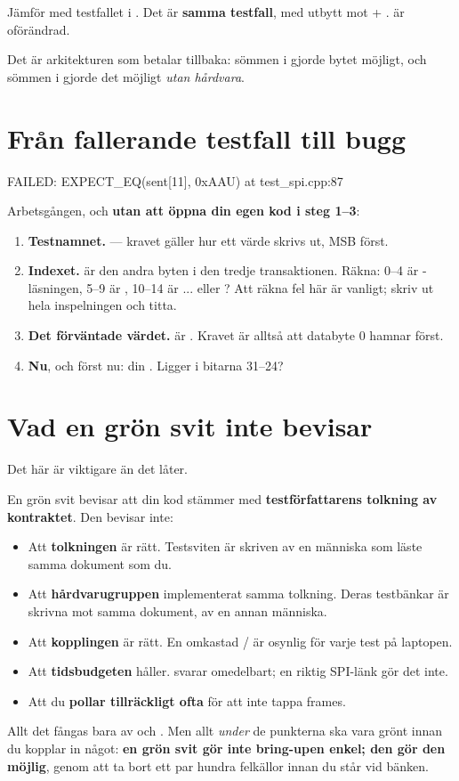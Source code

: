 Jämför med testfallet i . Det är \textbf{samma testfall}, med 
utbytt mot  + .  är oförändrad.

Det är arkitekturen som betalar tillbaka: sömmen i  gjorde bytet möjligt, och
sömmen i  gjorde det möjligt \emph{utan hårdvara}.

\section{Från fallerande testfall till bugg}
\label{sec:debugging}

\begin{console}
FAILED: EXPECT_EQ(sent[11], 0xAAU) at test_spi.cpp:87
\end{console}

Arbetsgången, och \textbf{utan att öppna din egen kod i steg 1--3}:

\begin{enumerate}
  \item \textbf{Testnamnet.}  --- kravet gäller hur
    ett värde skrivs ut, MSB först.
  \item \textbf{Indexet.}  är den andra byten i den tredje transaktionen. Räkna:
    0--4 är -läsningen, 5--9 är , 10--14 är ... eller
    ? Att räkna fel här är vanligt; skriv ut hela inspelningen och titta.
  \item \textbf{Det förväntade värdet.}  är . Kravet är alltså att
    databyte 0 hamnar först.
  \item \textbf{Nu}, och först nu: din . Ligger  i bitarna 31--24?
\end{enumerate}

\section{Vad en grön svit inte bevisar}
\label{sec:notproven}

Det här är viktigare än det låter.

En grön svit bevisar att din kod stämmer med \textbf{testförfattarens tolkning av kontraktet}. Den
bevisar inte:

\begin{itemize}
  \item Att \textbf{tolkningen} är rätt. Testsviten är skriven av en människa som läste samma
    dokument som du.
  \item Att \textbf{hårdvarugruppen} implementerat samma tolkning. Deras testbänkar är skrivna mot
    samma dokument, av en annan människa.
  \item Att \textbf{kopplingen} är rätt. En omkastad / är osynlig för varje
    test på laptopen.
  \item Att \textbf{tidsbudgeten} håller.  svarar omedelbart; en riktig
    SPI-länk gör det inte.
  \item Att du \textbf{pollar tillräckligt ofta} för att inte tappa frames.
\end{itemize}

Allt det fångas bara av  och . Men allt \emph{under} de
punkterna ska vara grönt innan du kopplar in något: \textbf{en grön svit gör inte bring-upen
enkel; den gör den möjlig}, genom att ta bort ett par hundra felkällor innan du står vid bänken.

